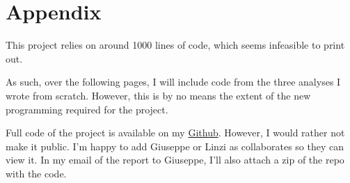 \documentclass[10pt]{article}
\begin{document}
%
%



{}

\newpage
\onecolumn
\section{Appendix}
This project relies on around 1000 lines of code, which seems infeasible to print out. 

As such, over the following pages, I will include code from the three analyses I wrote from scratch. However, this is by no means the extent of the new programming required for the project. 

Full code of the project is available on my \href{https://github.com/jjnunez11/MedicalEmbeddingsByField}{Github}. However, I would rather not make it public. I'm happy to add Giuseppe or Linzi as collaborates so they can view it. In my email of the report to Giuseppe, I'll also attach a zip of the repo with the code. 

\lstset{language=Python}
\lstset{frame=lines}
\lstset{basicstyle=\small}


\end{document}
